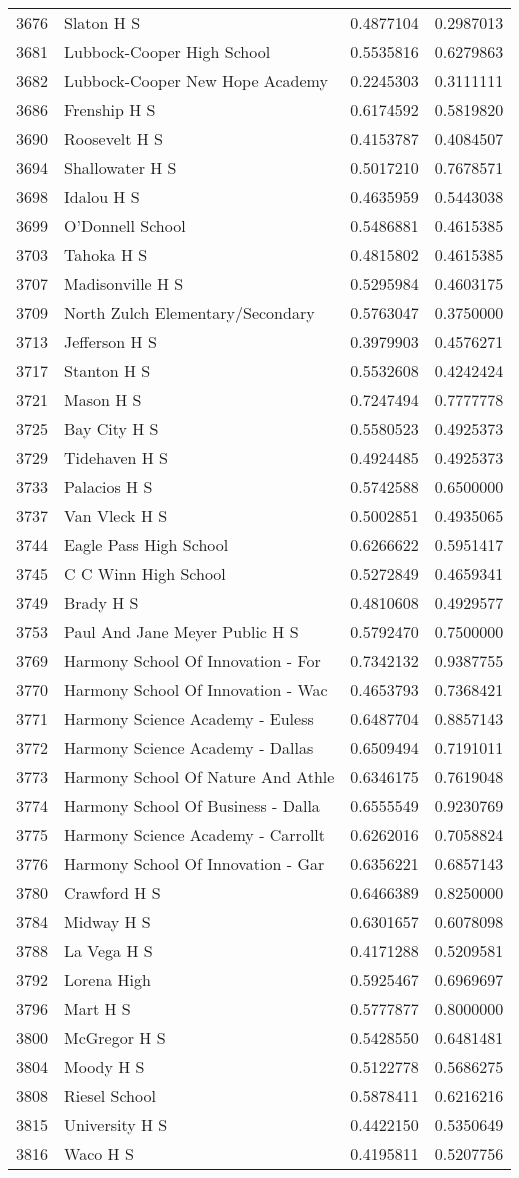 \documentclass[
]{article}
\begin{document}
\begin{longtable}[]{@{}llrr@{}}
3676 & Slaton H S & 0.4877104 & 0.2987013\tabularnewline
3681 & Lubbock-Cooper High School & 0.5535816 & 0.6279863\tabularnewline
3682 & Lubbock-Cooper New Hope Academy & 0.2245303 &
0.3111111\tabularnewline
3686 & Frenship H S & 0.6174592 & 0.5819820\tabularnewline
3690 & Roosevelt H S & 0.4153787 & 0.4084507\tabularnewline
3694 & Shallowater H S & 0.5017210 & 0.7678571\tabularnewline
3698 & Idalou H S & 0.4635959 & 0.5443038\tabularnewline
3699 & O'Donnell School & 0.5486881 & 0.4615385\tabularnewline
3703 & Tahoka H S & 0.4815802 & 0.4615385\tabularnewline
3707 & Madisonville H S & 0.5295984 & 0.4603175\tabularnewline
3709 & North Zulch Elementary/Secondary & 0.5763047 &
0.3750000\tabularnewline
3713 & Jefferson H S & 0.3979903 & 0.4576271\tabularnewline
3717 & Stanton H S & 0.5532608 & 0.4242424\tabularnewline
3721 & Mason H S & 0.7247494 & 0.7777778\tabularnewline
3725 & Bay City H S & 0.5580523 & 0.4925373\tabularnewline
3729 & Tidehaven H S & 0.4924485 & 0.4925373\tabularnewline
3733 & Palacios H S & 0.5742588 & 0.6500000\tabularnewline
3737 & Van Vleck H S & 0.5002851 & 0.4935065\tabularnewline
3744 & Eagle Pass High School & 0.6266622 & 0.5951417\tabularnewline
3745 & C C Winn High School & 0.5272849 & 0.4659341\tabularnewline
3749 & Brady H S & 0.4810608 & 0.4929577\tabularnewline
3753 & Paul And Jane Meyer Public H S & 0.5792470 &
0.7500000\tabularnewline
3769 & Harmony School Of Innovation - For & 0.7342132 &
0.9387755\tabularnewline
3770 & Harmony School Of Innovation - Wac & 0.4653793 &
0.7368421\tabularnewline
3771 & Harmony Science Academy - Euless & 0.6487704 &
0.8857143\tabularnewline
3772 & Harmony Science Academy - Dallas & 0.6509494 &
0.7191011\tabularnewline
3773 & Harmony School Of Nature And Athle & 0.6346175 &
0.7619048\tabularnewline
3774 & Harmony School Of Business - Dalla & 0.6555549 &
0.9230769\tabularnewline
3775 & Harmony Science Academy - Carrollt & 0.6262016 &
0.7058824\tabularnewline
3776 & Harmony School Of Innovation - Gar & 0.6356221 &
0.6857143\tabularnewline
3780 & Crawford H S & 0.6466389 & 0.8250000\tabularnewline
3784 & Midway H S & 0.6301657 & 0.6078098\tabularnewline
3788 & La Vega H S & 0.4171288 & 0.5209581\tabularnewline
3792 & Lorena High & 0.5925467 & 0.6969697\tabularnewline
3796 & Mart H S & 0.5777877 & 0.8000000\tabularnewline
3800 & McGregor H S & 0.5428550 & 0.6481481\tabularnewline
3804 & Moody H S & 0.5122778 & 0.5686275\tabularnewline
3808 & Riesel School & 0.5878411 & 0.6216216\tabularnewline
3815 & University H S & 0.4422150 & 0.5350649\tabularnewline
3816 & Waco H S & 0.4195811 & 0.5207756\tabularnewline

\end{longtable}
\end{document}

